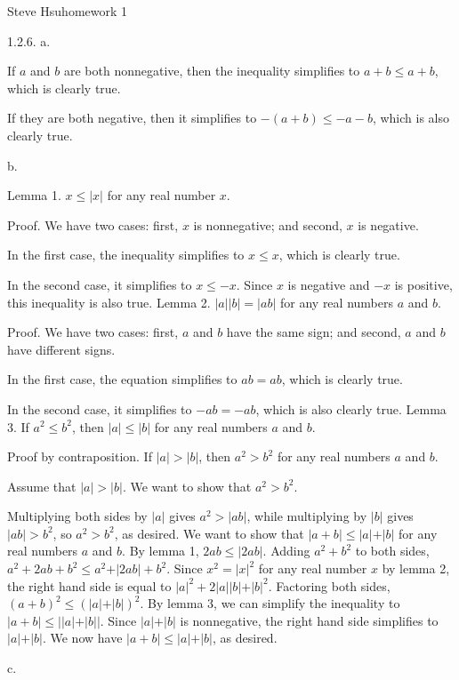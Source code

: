 \def\real{{\bf R}}
\def\rational{{\bf Q}}
\def\natural{{\bf N}}
\def\abs#1{\vert#1\vert}
\centerline{Steve Hsu\hfill homework 1}
\bigskip
\item{1.2.6.} a.

If $a$ and $b$ are both nonnegative,
then the inequality simplifies to $a + b \le a + b$, which is clearly true.

If they are both negative, then it simplifies to $-(a + b) \le -a - b$,
which is also clearly true.
\medskip
\item{} b.

Lemma 1. $x \le \abs x$ for any real number $x$.

Proof. We have two cases: first, $x$ is nonnegative;
and second, $x$ is negative.

In the first case, the inequality simplifies to $x \le x$,
which is clearly true.

In the second case, it simplifies to $x \le -x$.
Since $x$ is negative and $-x$ is positive,
this inequality is also true.
\medskip
Lemma 2. $\abs a \abs b = \abs{ab}$ for any real numbers $a$ and $b$.

Proof. We have two cases: first, $a$ and $b$ have the same sign;
and second, $a$ and $b$ have different signs.

In the first case, the equation simplifies to $ab = ab$,
which is clearly true.

In the second case, it simplifies to $-ab = -ab$, which is also clearly true.
\medskip
Lemma 3. If $a^2 \le b^2$,
then $\abs a \le \abs b$ for any real numbers $a$ and $b$.

Proof by contraposition. If $\abs a > \abs b$,
then $a^2 > b^2$ for any real numbers $a$ and $b$.

Assume that $\abs a > \abs b$.
We want to show that $a^2 > b^2$.

Multiplying both sides by $\abs a$ gives $a^2 > \abs{ab}$,
while multiplying by $\abs b$ gives $\abs{ab} > b^2$,
so $a^2 > b^2$, as desired.
\medskip
We want to show that $\abs{a + b} \le \abs a + \abs b$
for any real numbers $a$ and $b$.
By lemma 1, $2ab \le \abs{2ab}$.
Adding $a^2 + b^2$ to both sides,
$a^2 + 2ab + b^2 \le a^2 + \abs{2ab} + b^2$.
Since $x^2 = \abs x^2$ for any real number $x$ by lemma 2,
the right hand side is equal to ${\abs a}^2 + 2\abs a\abs b + \abs b^2$.
Factoring both sides, $(a + b)^2 \le (\abs a + \abs b)^2$.
By lemma 3, we can simplify the inequality to
$\abs{a + b} \le \abs{\abs a + \abs b}$.
Since $\abs a + \abs b$ is nonnegative,
the right hand side simplifies to $\abs a + \abs b$.
We now have $\abs{a + b} \le \abs a + \abs b$, as desired.
\medskip
\item{} c.

